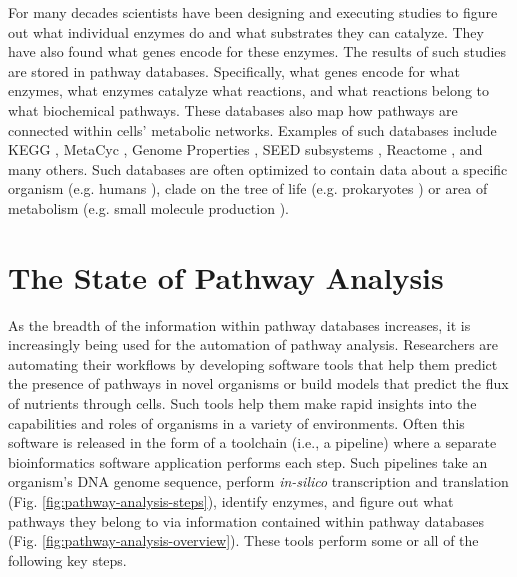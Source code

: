For many decades scientists have been designing and executing studies to figure out what individual enzymes do and what substrates they can catalyze. They have also found what genes encode for these enzymes. The results of such studies are stored in pathway databases. Specifically, what genes encode for what enzymes, what enzymes catalyze what reactions, and what reactions belong to what biochemical pathways. These databases also map how pathways are connected within cells' metabolic networks. Examples of such databases include KEGG \cite{kanehisa2000kegg}, MetaCyc \cite{karp2002metacyc}, Genome Properties \cite{richardson2018genome}, SEED subsystems \cite{overbeek2005subsystems}, Reactome \cite{croft2013reactome}, and many others. Such databases are often optimized to contain data about a specific organism (e.g. humans \cite{croft2013reactome}), clade on the tree of life (e.g. prokaryotes \cite{richardson2018genome}) or area of metabolism (e.g. small molecule production \cite{Jewison2014}).

\section{The State of Pathway Analysis}

As the breadth of the information within pathway databases increases, it is increasingly being used for the automation of pathway analysis. Researchers are automating their workflows by developing software tools that help them predict the presence of pathways in novel organisms or build models that predict the flux of nutrients through cells. Such tools help them make rapid insights into the capabilities and roles of organisms in a variety of environments. Often this software is released in the form of a toolchain (i.e., a pipeline) where a separate bioinformatics software application performs each step. Such pipelines take an organism's DNA genome sequence, perform \textit{in-silico} transcription and translation (Fig. \ref{fig:pathway-analysis-steps}), identify enzymes, and figure out what pathways they belong to via information contained within pathway databases (Fig. \ref{fig:pathway-analysis-overview}). These tools perform some or all of the following key steps.

